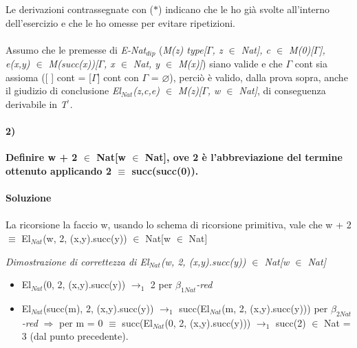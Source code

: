 \vspace{0.5cm}
\noindent
\normalsize Le derivazioni contrassegnate con ($\ast$) indicano che le ho gi\`a svolte all'interno dell'esercizio e che le ho omesse per evitare ripetizioni.\\\\
\noindent
Assumo che le premesse di \textit{E-Nat$_{dip}$} (\textit{M(z) type[$\Gamma$, z $\in$ Nat], c $\in$ M(0)[$\Gamma$], e(x,y) $\in$ M(succ(x))[$\Gamma$, x $\in$ Nat, y $\in$ M(x)]}) siano valide e che $\Gamma$ cont sia assioma ([ ] cont = [$\Gamma$] cont con $\Gamma$ = $\varnothing$), perci\`o \`e valido, dalla prova sopra, anche il giudizio di conclusione \textit{El$_{Nat}$(z,c,e) $\in$ M(z)[$\Gamma$, w $\in$ Nat]}, di conseguenza derivabile in \textit{T$^\backprime$}.

\paragraph{2)}
\textbf{Definire w + 2 $\in$ Nat[w $\in$ Nat], ove 2 \`e l'abbreviazione del termine ottenuto applicando 2 $\equiv$ succ(succ(0)).}
\\\\
\textbf{Soluzione}\\\\
La ricorsione la faccio w, usando lo schema di ricorsione primitiva, vale che w + 2 $\equiv$ El$_{Nat}$(w, 2, (x,y).succ(y)) $\in$ Nat[w $\in$ Nat]

\small
\begin{adjustwidth}{-5em}{}
\begin{prooftree}
\end{prooftree}
\end{adjustwidth}
\noindent
\normalsize \textit{Dimostrazione di correttezza di El$_{Nat}$(w, 2, (x,y).succ(y)) $\in$ Nat[w $\in$ Nat]}
\begin{itemize}
\item El$_{Nat}$(0, 2, (x,y).succ(y)) $\rightarrow_1$ 2 per \textit{$\beta_{1Nat}$-red}
\item El$_{Nat}$(succ(m), 2, (x,y).succ(y)) $\rightarrow_1$ succ(El$_{Nat}$(m, 2, (x,y).succ(y))) per \textit{$\beta_{2Nat}$-red} $\Rightarrow$ per m = 0 $\equiv$ succ(El$_{Nat}$(0, 2, (x,y).succ(y))) $\rightarrow_1$ succ(2) $\in$ Nat = 3 (dal punto precedente).
\end{itemize}

